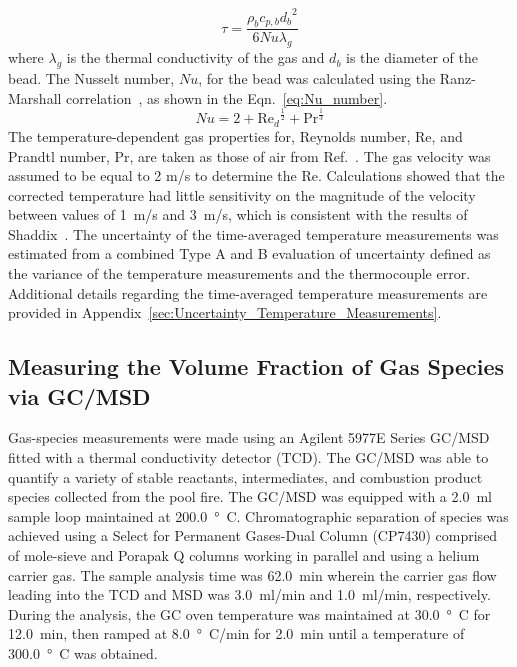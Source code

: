 \documentclass[12pt]{article}
\begin{document}
\begin{equation}\label{eq:tau}
\tau= \frac{\rho_{b}c_{p,b}{d_{b}}^2}{6Nu\lambda_{g}}
\end{equation}
where $\lambda_{g}$ is the thermal conductivity of the gas and $d_{b}$ is the diameter of the bead. The Nusselt number, $Nu$, for the bead was calculated using the Ranz-Marshall correlation~\cite{Shaddix1999}, as shown in the Eqn.~\ref{eq:Nu_number}. 
\begin{equation}\label{eq:Nu_number}
Nu= 2+{\textrm{Re}_{d}}^{\frac{1}{2}}+\textrm{Pr}^{\frac{1}{3}}
\end{equation}
The temperature-dependent gas properties for, Reynolds number, Re, and Prandtl number, Pr, are taken as those of air from Ref.~\cite{Dippr}. The gas velocity was assumed to be equal to 2 m/s to determine the Re. Calculations showed that the corrected temperature had little sensitivity on the magnitude of the velocity between values of \SI{1}{ m/s} and \SI{3}{m/s}, which is consistent with the results of Shaddix~\cite{Shaddix1999}. The uncertainty of the time-averaged temperature measurements was estimated from a combined Type A and B evaluation of uncertainty defined as the variance of the temperature measurements and the thermocouple error. Additional details regarding the time-averaged temperature measurements are provided in Appendix~\ref{sec:Uncertainty_Temperature_Measurements}.
 
\subsection{Measuring the Volume Fraction of Gas Species via GC/MSD}
\label{ssec:Gas_Species_Setup}

Gas-species measurements were made using an Agilent 5977E Series GC/MSD fitted with a thermal conductivity detector (TCD). The GC/MSD was able to quantify a variety of stable reactants, intermediates, and combustion product species collected from the pool fire. The GC/MSD was equipped with a \SI{2.0}{ml} sample loop maintained at \SI{200.0}{\degree C}. Chromatographic separation of species was achieved using a Select for Permanent Gases-Dual Column (CP7430) comprised of mole-sieve and Porapak Q columns working in parallel and using a helium carrier gas. The sample analysis time was \SI{62.0}{min} wherein the carrier gas flow leading into the TCD and MSD was \SI{3.0}{ml/min} and \SI{1.0}{ml/min}, respectively. During the analysis, the GC oven temperature was maintained at \SI{30.0}{\degree C} for \SI{12.0}{min}, then ramped at \SI{8.0}{\degree C/min} for \SI{2.0}{min} until a temperature of \SI{300.0}{\degree C} was obtained.
\end{document}
